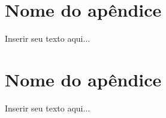 %
%

\apendice
\chapter{Nome do apêndice}
\label{chap:apendicex}

Inserir seu texto aqui...

\chapter{Nome do apêndice}
\label{chap:apendicey}

Inserir seu texto aqui...
